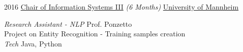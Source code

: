 \documentclass[hidelinks]{cv-style}          %
\begin{document}
\begin{entrylist}
{}


\entry
{2016}
{\href{http://dws.informatik.uni-mannheim.de/en/people/professors/profdrsimonepaoloponzetto/}{Chair of Information Systems III} {\normalfont \emph{(6 Months)}}}
{\href{https://www.wim.uni-mannheim.de/de/fakultaet/}{University of Mannheim}}
{\emph{Research Assistant - NLP}  Prof. Ponzetto\\
Project on Entity Recognition - Training samples creation\\
\emph{Tech} Java, Python

}












\end{entrylist}
\end{document}
